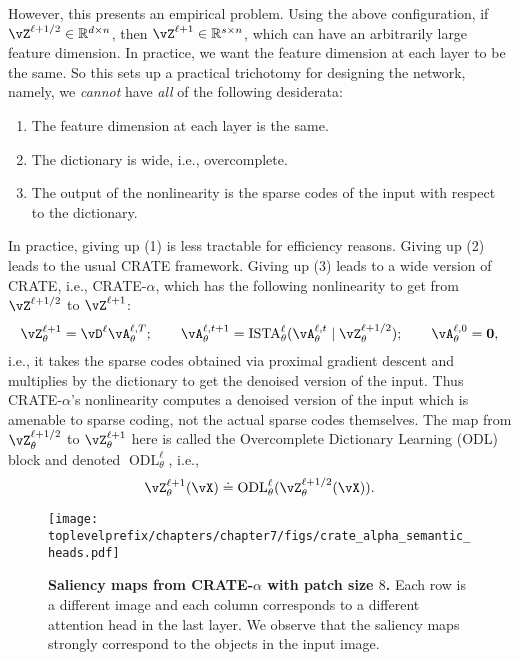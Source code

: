\documentclass[../../book-main.tex]{subfiles}
\begin{document}
However, this presents an empirical problem. Using the above configuration, if \(\vZ^{\ell + 1/2} \in \R^{d \times n}\), then \(\vZ^{\ell + 1} \in \R^{s \times n}\), which can have an arbitrarily large feature dimension. In practice, we want the feature dimension at each layer to be the same. So this sets up a practical trichotomy for designing the network, namely, we \textit{cannot} have \textit{all} of the following desiderata:
\begin{enumerate}
    \item The feature dimension at each layer is the same.
    \item The dictionary is wide, i.e., overcomplete.
    \item The output of the nonlinearity is the sparse codes of the input with respect to the dictionary.
\end{enumerate}
In practice, giving up (1) is less tractable for efficiency reasons. Giving up (2) leads to the usual CRATE framework. Giving up (3) leads to a wide version of CRATE, i.e., CRATE-\(\alpha\), which has the following nonlinearity to get from \(\vZ^{\ell + 1/2}\) to \(\vZ^{\ell + 1}\):
\begin{equation}
    \vZ_{\theta}^{\ell + 1} = \vD^{\ell}\vA_{\theta}^{\ell, T}; \qquad \vA_{\theta}^{\ell, t + 1} = \ISTA_{\theta}^{\ell}(\vA_{\theta}^{\ell, t} \mid \vZ_{\theta}^{\ell + 1/2}); \qquad \vA_{\theta}^{\ell, 0} = \vzero,
\end{equation}
i.e., it takes the sparse codes obtained via proximal gradient descent and multiplies by the dictionary to get the denoised version of the input. Thus CRATE-\(\alpha\)'s nonlinearity computes a denoised version of the input which is amenable to sparse coding, not the actual sparse codes themselves. The map from \(\vZ_{\theta}^{\ell + 1/2}\) to \(\vZ_{\theta}^{\ell + 1}\) here is called the Overcomplete Dictionary Learning (ODL) block and denoted \(\operatorname{ODL}_{\theta}^{\ell}\), i.e.,
\begin{equation}
    \vZ_{\theta}^{\ell + 1}(\vX) \doteq \operatorname{ODL}_{\theta}^{\ell}(\vZ_{\theta}^{\ell + 1/2}(\vX)).
\end{equation}



\begin{figure}[t]
    \centering 
    \texttt{[image: \\toplevelprefix/chapters/chapter7/figs/crate\_alpha\_semantic\_heads.pdf]}
    \caption{\small\textbf{Saliency maps from CRATE-\(\alpha\) with patch size \(8\).} Each row is a different image and each column corresponds to a different attention head in the last layer. We observe that the saliency maps strongly correspond to the objects in the input image.}
    \label{fig:crate_alpha_saliency_maps}
\end{figure}
\end{document}
